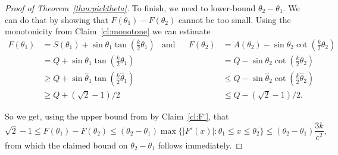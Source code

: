 \documentclass[10pt,a4paper]{amsart}
\newcommand{\htheta}{\hat{\theta}}
\begin{document}
\begin{proof}[Proof of Theorem~\ref{thm:picktheta}]
To finish, we need to lower-bound $\theta_2-\theta_1$. We can do that by showing that $F(\theta_1) - F(\theta_2)$ cannot be too small. Using the monotonicity from Claim~\ref{cl:monotone} we can estimate
\begin{align*}F(\theta_1) &= S(\theta_1) + \sin \theta_1 \tan\left(\tfrac{k}{2}\theta_1 \right) 
&\mbox{and}&& F(\theta_2) &= A(\theta_2) - \sin \theta_2 \cot\left(\tfrac{k}{2}\theta_2 \right)
\\ 
&= Q + \sin \theta_1 \tan\left(\tfrac{k}{2}\theta_1 \right) & & &  &= Q - \sin \theta_2 \cot\left(\tfrac{k}{2}\theta_2 \right)
\\ 
&\geq Q + \sin \htheta_1 \tan\left(\tfrac{k}{2}\htheta_1 \right) & & & &\leq Q - \sin \htheta_2 \cot\left(\tfrac{k}{2}\htheta_2 \right)
\\ 
&\geq Q + (\sqrt{2}-1)/2 
&&&   &\leq Q - (\sqrt{2}-1)/2.\end{align*}

So we get, using the upper bound from by Claim~\ref{cl:F'}, that
\[ \sqrt{2}-1 \leq F(\theta_1) - F(\theta_2) \leq (\theta_2 - \theta_1)\max\{|F'(x)|: \theta_1 \leq x \leq \theta_2\} \leq (\theta_2 -\theta_1) \frac{3k}{c^2},\] from which the claimed bound on $\theta_2 - \theta_1$ follows immediately.
\end{proof}
\end{document}
